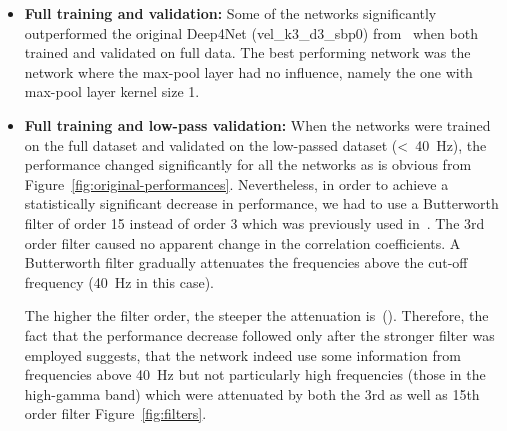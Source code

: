 \begin{itemize}
    \item \textbf{Full training and validation:} Some of the networks significantly outperformed the original Deep4Net (vel\_k3\_d3\_sbp0) from~\cite{Hammer-2021} when both trained and validated on full data.
    The best performing network was the network where the max-pool layer had no influence, namely the one with max-pool layer kernel size 1.
    
    \item \textbf{Full training and low-pass validation:} When the networks were trained on the full dataset and validated on the low-passed dataset (<~40~Hz), the performance changed significantly for all the networks as is obvious from Figure~\ref{fig:original-performances}.
    Nevertheless, in order to achieve a statistically significant decrease in performance, we had to use a Butterworth filter of order 15 instead of order 3 which was previously used in~\cite{Hammer-2021}. The 3rd order filter caused no apparent change in the correlation coefficients.
    A Butterworth filter gradually attenuates the frequencies above the cut-off frequency (40~Hz in this case).

    The higher the filter order, the steeper the attenuation is~(\cite{butterworth1930theory}).
    Therefore, the fact that the performance decrease followed only after the stronger filter was employed suggests, that the network indeed use some information from frequencies above 40~Hz but not particularly high frequencies (those in the high-gamma band) which were attenuated by both the 3rd as well as 15th order filter Figure~\ref{fig:filters}.
    

\end{itemize}
